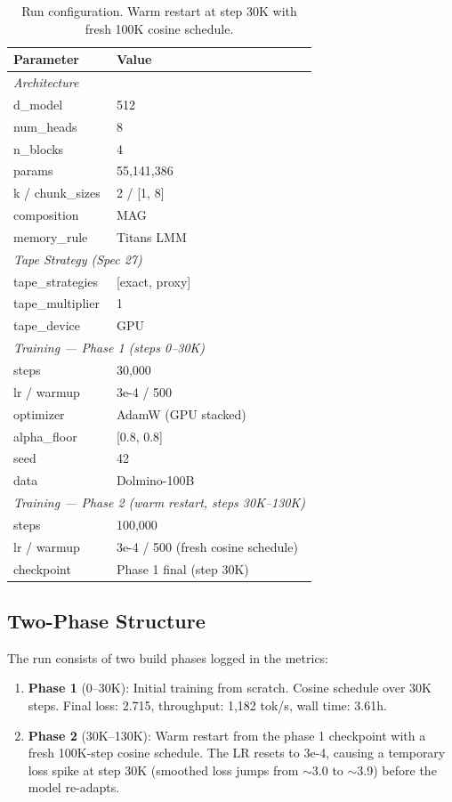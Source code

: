 \documentclass[11pt,a4paper]{article}
\begin{document}
\begin{table}[H]
\centering
\caption{Run configuration. Warm restart at step 30K with fresh 100K cosine schedule.}
\begin{tabular}{ll}
\toprule
\textbf{Parameter} & \textbf{Value} \\
\midrule
\multicolumn{2}{l}{\textit{Architecture}} \\
\quad d\_model & 512 \\
\quad num\_heads & 8 \\
\quad n\_blocks & 4 \\
\quad params & 55,141,386 \\
\quad k / chunk\_sizes & 2 / [1, 8] \\
\quad composition & MAG \\
\quad memory\_rule & Titans LMM \\
\midrule
\multicolumn{2}{l}{\textit{Tape Strategy (Spec 27)}} \\
\quad tape\_strategies & [exact, proxy] \\
\quad tape\_multiplier & 1 \\
\quad tape\_device & GPU \\
\midrule
\multicolumn{2}{l}{\textit{Training --- Phase 1 (steps 0--30K)}} \\
\quad steps & 30,000 \\
\quad lr / warmup & 3e-4 / 500 \\
\quad optimizer & AdamW (GPU stacked) \\
\quad alpha\_floor & [0.8, 0.8] \\
\quad seed & 42 \\
\quad data & Dolmino-100B \\
\midrule
\multicolumn{2}{l}{\textit{Training --- Phase 2 (warm restart, steps 30K--130K)}} \\
\quad steps & 100,000 \\
\quad lr / warmup & 3e-4 / 500 (fresh cosine schedule) \\
\quad checkpoint & Phase 1 final (step 30K) \\
\bottomrule
\end{tabular}
\end{table}

\subsection{Two-Phase Structure}

The run consists of two build phases logged in the metrics:
\begin{enumerate}
    \item \textbf{Phase 1} (0--30K): Initial training from scratch. Cosine schedule over 30K steps.
          Final loss: 2.715, throughput: 1,182 tok/s, wall time: 3.61h.
    \item \textbf{Phase 2} (30K--130K): Warm restart from the phase 1 checkpoint with a fresh
          100K-step cosine schedule. The LR resets to 3e-4, causing a temporary loss spike at step 30K
          (smoothed loss jumps from $\sim$3.0 to $\sim$3.9) before the model re-adapts.
\end{enumerate}
\end{document}
